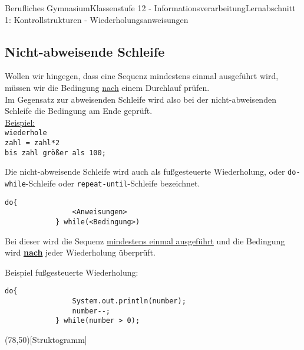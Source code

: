 \documentclass[11pt,oneside,openany,headings=optiontotoc,11pt,numbers=noenddot]{article}
\begin{document}
\begin{worksheet}{Berufliches Gymnasium}{Klassenstufe 12 - Informationsverarbeitung}{Lernabschnitt 1: Kontrollstrukturen - Wiederholungsanweisungen}
		\subsection{Nicht-abweisende Schleife}
		Wollen wir hingegen, dass eine Sequenz mindestens einmal ausgeführt wird, müssen wir die Bedingung \underline{nach} einem Durchlauf prüfen.\\
		Im Gegensatz zur abweisenden Schleife wird also bei der nicht-abweisenden Schleife die Bedingung am Ende geprüft.\\
		\underline{Beispiel:}\\
		\texttt{\indent{}wiederhole\\
		\indent{}\indent{}zahl = zahl*2\\
		\indent\indent\indent{}bis zahl größer als 100;}\\
		\par\noindent
		Die nicht-abweisende Schleife wird auch als fußgesteuerte Wiederholung, oder \lstinline[style=JavaInputStyle]{do-while}-Schleife oder \lstinline[style=JavaInputStyle]{repeat-until}-Schleife bezeichnet.\\
		\begin{lstlisting}[style=JavaInputStyle]
			do{
				<Anweisungen>
			} while(<Bedingung>)
		\end{lstlisting}
		\par\noindent
		Bei dieser wird die Sequenz \underline{mindestens einmal ausgeführt} und die Bedingung wird \textbf{\underline{nach}} jeder Wiederholung überprüft.\\
		\par\noindent
		\begin{minipage}[t]{0.48\textwidth}
			\vspace*{0pt}
			Beispiel fußgesteuerte Wiederholung:
			\begin{lstlisting}[style=JavaInputStyle,frame=single]
			do{
				System.out.println(number);
				number--;
			} while(number > 0);
			\end{lstlisting}
		\end{minipage}
		\hfill
		\begin{minipage}[t]{0.48\textwidth}
			\vspace*{0pt}
			\begin{struktogramm}(78,50)[Struktogramm]
				\untilend
			\end{struktogramm}
		\end{minipage}
	\end{worksheet}
\end{document}
